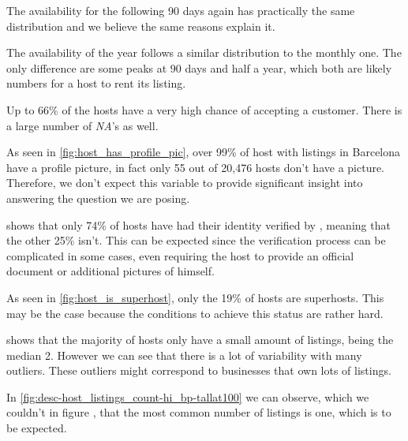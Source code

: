 
The availability for the following 90 days again has practically
the same distribution and we believe the same reasons explain it.


The availability of the year follows a similar distribution to the monthly one.
The only difference are some peaks at 90 days and half a year, which both are
likely numbers for a host to rent its listing.



Up to 66\% of the hosts have a very high chance of accepting a customer. There
is a large number of \emph{NA}'s as well.



As seen in \cref{fig:host_has_profile_pic}, over 99\% of host with
listings in Barcelona have a profile picture, in fact only 55 out of 20,476
hosts don't have a picture. Therefore, we don't expect this variable to provide
significant insight into answering the question we are posing.


 shows that only 74\% of hosts have had
their identity verified by \airbnb, meaning that the other 25\% isn't.  This can
be expected since the verification process can be complicated in some cases,
even requiring the host to provide an official document or additional pictures
of himself.


As seen in \cref{fig:host_is_superhost}, only the 19\% of hosts are superhosts.
This may be the case because the conditions to achieve this status are rather hard.



 shows that the majority of hosts only have a
small amount of listings, being the median 2. However we can see that there is a
lot of variability with many outliers. These outliers might correspond to
businesses that own lots of listings.


In \cref{fig:desc-host_listings_count-hi_bp-tallat100} we can observe, which we couldn't in figure , that
the most common number of listings is one, which is to be expected.

